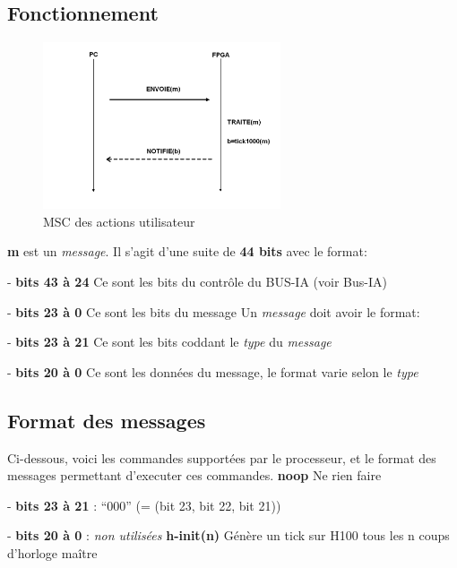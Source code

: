 \documentclass[10pt]{article}
\begin{document}
        \subsection{Fonctionnement}
        \begin{figure}[h!]
            \includegraphics[width=7cm]{fonctionnement.png}
            \caption{MSC des actions utilisateur}
        \end{figure}
        
        \textbf{m} est un \textit{message}. Il s'agit d'une suite de \textbf{44 bits} avec le format:
        
        - \textbf{bits 43 à 24} Ce sont les bits du contrôle du BUS-IA (voir Bus-IA)
        
        - \textbf{bits 23 à 0} Ce sont les bits du message
        \newline
        \newline
        Un \textit{message} doit avoir le format:
        
        - \textbf{bits 23 à 21} Ce sont les bits coddant le \textit{type} du \textit{message}
        
        - \textbf{bits 20 à 0} Ce sont les données du message, le format varie selon le \textit{type}
        
        \subsection{Format des messages}\label{formatmsg}
        
        Ci-dessous, voici les commandes supportées par le processeur,
        et le format des messages permettant d'executer ces commandes.
        \newline
        \newline
        \textbf{noop} Ne rien faire
        
        - \textbf{bits 23 à 21} : ``000'' (= (bit 23, bit 22, bit 21))

        - \textbf{bits 20 à 0} : \textit{non utilisées}
        \newline
        \newline
        \textbf{h-init(n)} Génère un tick sur H100 tous les n coups d'horloge maître
        
\end{document}
